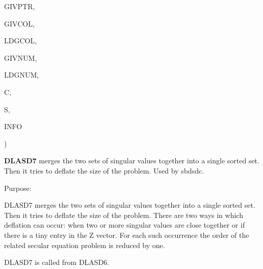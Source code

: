 {\begin{DoxyParamCaption}
\item[{integer}]{G\+I\+V\+P\+T\+R, }
\item[{integer, dimension( ldgcol, $\ast$ )}]{G\+I\+V\+C\+O\+L, }
\item[{integer}]{L\+D\+G\+C\+O\+L, }
\item[{double {\bf precision}, dimension( ldgnum, $\ast$ )}]{G\+I\+V\+N\+U\+M, }
\item[{integer}]{L\+D\+G\+N\+U\+M, }
\item[{double {\bf precision}}]{C, }
\item[{double {\bf precision}}]{S, }
\item[{integer}]{I\+N\+F\+O}
\end{DoxyParamCaption}
)}\label{group__auxOTHERauxiliary_ga5ec18a9b77aca48cfc490ad5022eeafe}


{\bfseries D\+L\+A\+S\+D7} merges the two sets of singular values together into a single sorted set. Then it tries to deflate the size of the problem. Used by sbdsdc. 

 \begin{DoxyParagraph}{Purpose\+: }
\begin{DoxyVerb} DLASD7 merges the two sets of singular values together into a single
 sorted set. Then it tries to deflate the size of the problem. There
 are two ways in which deflation can occur:  when two or more singular
 values are close together or if there is a tiny entry in the Z
 vector. For each such occurrence the order of the related
 secular equation problem is reduced by one.

 DLASD7 is called from DLASD6.\end{DoxyVerb}
 
\end{DoxyParagraph}

